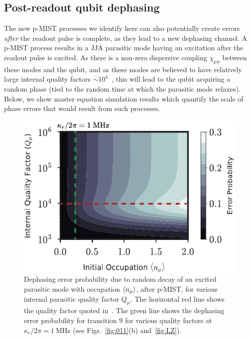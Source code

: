 \documentclass[%
reprint,
superscriptaddress,
 amsmath,amssymb,
 aps,
 prx,
longbibliography,
floatfix,
]{revtex4-2}
\begin{document}
\subsection{Post-readout qubit dephasing} 

The new p-MIST processes we identify here can also potentially create errors \textit{after} the readout pulse is complete, as they lead to a new dephasing channel.  A p-MIST process results in a JJA parasitic mode having an excitation after the readout pulse is excited.  As there is a non-zero dispersive coupling 
$\chi_{\mu \phi}$ between these modes and the qubit, and as these modes are believed to have relatively large internal quality factors $\sim 10^{4}$~\cite{masluk_microwave_2012, masluk2013reducing}, this will lead to the qubit acquiring a random phase (tied to the random time at which the parasitic mode relaxes).  Below, we show master equation simulation results which quantify the
scale of phase errors that would result from such processes. 

\begin{figure}[htb]
    \centering
    \includegraphics[width=\linewidth]{Figures/dephasing.pdf}
    \caption{Dephasing error probability due to random decay of an excited parasitic mode with occupation $\braket{n_\mu}$, after p-MIST, for various internal parasitic quality factor $Q_\mu$. The horizontal red line shows the quality factor quoted in~\cite{masluk_microwave_2012}. The green line shows the dephasing error probability for transition $9$ for various quality factors at $\kappa_r/2\pi=1 \ \mathrm{MHz}$ (see Figs.~\ref{fig:011}(b) and~\ref{fig:LZ}).}
    \label{fig:dephasing}
\end{figure}
\end{document}

